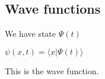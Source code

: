 
\subsection{Wave functions}

We have state \(\Psi (t)\)

\(\psi(x,t)=\langle x\rvert \Psi (t) \rangle\)

This is the wave function.

